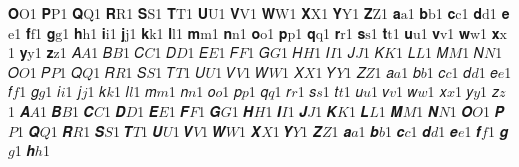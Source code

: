 {𝐎}{{\(\bm{{\mathrm{O}}}\)}}1 {𝐏}{{\(\bm{{\mathrm{P}}}\)}}1 {𝐐}{{\(\bm{{\mathrm{Q}}}\)}}1 {𝐑}{{\(\bm{{\mathrm{R}}}\)}}1 {𝐒}{{\(\bm{{\mathrm{S}}}\)}}1 {𝐓}{{\(\bm{{\mathrm{T}}}\)}}1 {𝐔}{{\(\bm{{\mathrm{U}}}\)}}1 {𝐕}{{\(\bm{{\mathrm{V}}}\)}}1 {𝐖}{{\(\bm{{\mathrm{W}}}\)}}1 {𝐗}{{\(\bm{{\mathrm{X}}}\)}}1 {𝐘}{{\(\bm{{\mathrm{Y}}}\)}}1 {𝐙}{{\(\bm{{\mathrm{Z}}}\)}}1 {𝐚}{{\(\bm{{\mathrm{a}}}\)}}1 {𝐛}{{\(\bm{{\mathrm{b}}}\)}}1 {𝐜}{{\(\bm{{\mathrm{c}}}\)}}1 {𝐝}{{\(\bm{{\mathrm{d}}}\)}}1 {𝐞}{{\(\bm{{\mathrm{e}}}\)}}1 {𝐟}{{\(\bm{{\mathrm{f}}}\)}}1 {𝐠}{{\(\bm{{\mathrm{g}}}\)}}1 {𝐡}{{\(\bm{{\mathrm{h}}}\)}}1 {𝐢}{{\(\bm{{\mathrm{i}}}\)}}1 {𝐣}{{\(\bm{{\mathrm{j}}}\)}}1 {𝐤}{{\(\bm{{\mathrm{k}}}\)}}1 {𝐥}{{\(\bm{{\mathrm{l}}}\)}}1 {𝐦}{{\(\bm{{\mathrm{m}}}\)}}1 {𝐧}{{\(\bm{{\mathrm{n}}}\)}}1 {𝐨}{{\(\bm{{\mathrm{o}}}\)}}1 {𝐩}{{\(\bm{{\mathrm{p}}}\)}}1 {𝐪}{{\(\bm{{\mathrm{q}}}\)}}1 {𝐫}{{\(\bm{{\mathrm{r}}}\)}}1 {𝐬}{{\(\bm{{\mathrm{s}}}\)}}1 {𝐭}{{\(\bm{{\mathrm{t}}}\)}}1 {𝐮}{{\(\bm{{\mathrm{u}}}\)}}1 {𝐯}{{\(\bm{{\mathrm{v}}}\)}}1 {𝐰}{{\(\bm{{\mathrm{w}}}\)}}1 {𝐱}{{\(\bm{{\mathrm{x}}}\)}}1 {𝐲}{{\(\bm{{\mathrm{y}}}\)}}1 {𝐳}{{\(\bm{{\mathrm{z}}}\)}}1 {𝐴}{{\(\mathit{A}\)}}1 {𝐵}{{\(\mathit{B}\)}}1 {𝐶}{{\(\mathit{C}\)}}1 {𝐷}{{\(\mathit{D}\)}}1 {𝐸}{{\(\mathit{E}\)}}1 {𝐹}{{\(\mathit{F}\)}}1 {𝐺}{{\(\mathit{G}\)}}1 {𝐻}{{\(\mathit{H}\)}}1 {𝐼}{{\(\mathit{I}\)}}1 {𝐽}{{\(\mathit{J}\)}}1 {𝐾}{{\(\mathit{K}\)}}1 {𝐿}{{\(\mathit{L}\)}}1 {𝑀}{{\(\mathit{M}\)}}1 {𝑁}{{\(\mathit{N}\)}}1 {𝑂}{{\(\mathit{O}\)}}1 {𝑃}{{\(\mathit{P}\)}}1 {𝑄}{{\(\mathit{Q}\)}}1 {𝑅}{{\(\mathit{R}\)}}1 {𝑆}{{\(\mathit{S}\)}}1 {𝑇}{{\(\mathit{T}\)}}1 {𝑈}{{\(\mathit{U}\)}}1 {𝑉}{{\(\mathit{V}\)}}1 {𝑊}{{\(\mathit{W}\)}}1 {𝑋}{{\(\mathit{X}\)}}1 {𝑌}{{\(\mathit{Y}\)}}1 {𝑍}{{\(\mathit{Z}\)}}1 {𝑎}{{\(\mathit{a}\)}}1 {𝑏}{{\(\mathit{b}\)}}1 {𝑐}{{\(\mathit{c}\)}}1 {𝑑}{{\(\mathit{d}\)}}1 {𝑒}{{\(\mathit{e}\)}}1 {𝑓}{{\(\mathit{f}\)}}1 {𝑔}{{\(\mathit{g}\)}}1 {𝑖}{{\(\mathit{i}\)}}1 {𝑗}{{\(\mathit{j}\)}}1 {𝑘}{{\(\mathit{k}\)}}1 {𝑙}{{\(\mathit{l}\)}}1 {𝑚}{{\(\mathit{m}\)}}1 {𝑛}{{\(\mathit{n}\)}}1 {𝑜}{{\(\mathit{o}\)}}1 {𝑝}{{\(\mathit{p}\)}}1 {𝑞}{{\(\mathit{q}\)}}1 {𝑟}{{\(\mathit{r}\)}}1 {𝑠}{{\(\mathit{s}\)}}1 {𝑡}{{\(\mathit{t}\)}}1 {𝑢}{{\(\mathit{u}\)}}1 {𝑣}{{\(\mathit{v}\)}}1 {𝑤}{{\(\mathit{w}\)}}1 {𝑥}{{\(\mathit{x}\)}}1 {𝑦}{{\(\mathit{y}\)}}1 {𝑧}{{\(\mathit{z}\)}}1 {𝑨}{{\(\bm{{\mathit{A}}}\)}}1 {𝑩}{{\(\bm{{\mathit{B}}}\)}}1 {𝑪}{{\(\bm{{\mathit{C}}}\)}}1 {𝑫}{{\(\bm{{\mathit{D}}}\)}}1 {𝑬}{{\(\bm{{\mathit{E}}}\)}}1 {𝑭}{{\(\bm{{\mathit{F}}}\)}}1 {𝑮}{{\(\bm{{\mathit{G}}}\)}}1 {𝑯}{{\(\bm{{\mathit{H}}}\)}}1 {𝑰}{{\(\bm{{\mathit{I}}}\)}}1 {𝑱}{{\(\bm{{\mathit{J}}}\)}}1 {𝑲}{{\(\bm{{\mathit{K}}}\)}}1 {𝑳}{{\(\bm{{\mathit{L}}}\)}}1 {𝑴}{{\(\bm{{\mathit{M}}}\)}}1 {𝑵}{{\(\bm{{\mathit{N}}}\)}}1 {𝑶}{{\(\bm{{\mathit{O}}}\)}}1 {𝑷}{{\(\bm{{\mathit{P}}}\)}}1 {𝑸}{{\(\bm{{\mathit{Q}}}\)}}1 {𝑹}{{\(\bm{{\mathit{R}}}\)}}1 {𝑺}{{\(\bm{{\mathit{S}}}\)}}1 {𝑻}{{\(\bm{{\mathit{T}}}\)}}1 {𝑼}{{\(\bm{{\mathit{U}}}\)}}1 {𝑽}{{\(\bm{{\mathit{V}}}\)}}1 {𝑾}{{\(\bm{{\mathit{W}}}\)}}1 {𝑿}{{\(\bm{{\mathit{X}}}\)}}1 {𝒀}{{\(\bm{{\mathit{Y}}}\)}}1 {𝒁}{{\(\bm{{\mathit{Z}}}\)}}1 {𝒂}{{\(\bm{{\mathit{a}}}\)}}1 {𝒃}{{\(\bm{{\mathit{b}}}\)}}1 {𝒄}{{\(\bm{{\mathit{c}}}\)}}1 {𝒅}{{\(\bm{{\mathit{d}}}\)}}1 {𝒆}{{\(\bm{{\mathit{e}}}\)}}1 {𝒇}{{\(\bm{{\mathit{f}}}\)}}1 {𝒈}{{\(\bm{{\mathit{g}}}\)}}1 {𝒉}{{\(\bm{{\mathit{h}}}\)}}1 